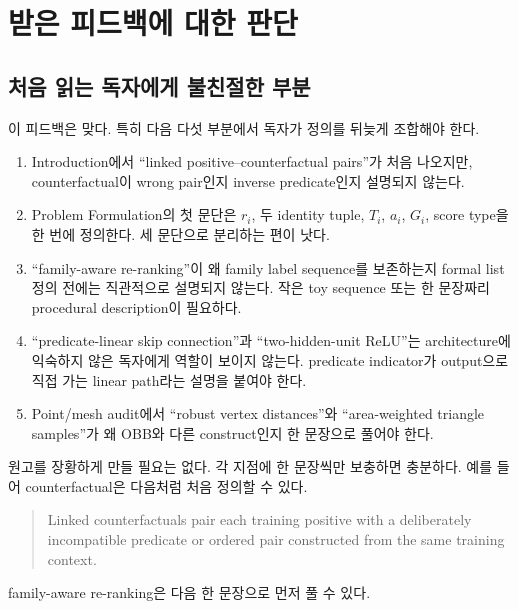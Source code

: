 \documentclass[11pt]{article}
\begin{document}
\section{받은 피드백에 대한 판단}

\subsection{처음 읽는 독자에게 불친절한 부분}

이 피드백은 맞다. 특히 다음 다섯 부분에서 독자가 정의를 뒤늦게 조합해야 한다.

\begin{enumerate}[leftmargin=2em]
    \item Introduction에서 ``linked positive--counterfactual pairs''가 처음
    나오지만, counterfactual이 wrong pair인지 inverse predicate인지 설명되지 않는다.
    
    \item Problem Formulation의 첫 문단은 $r_i$, 두 identity tuple, $T_i$, $a_i$,
    $G_i$, score type을 한 번에 정의한다. 세 문단으로 분리하는 편이 낫다.

    \item ``family-aware re-ranking''이 왜 family label sequence를 보존하는지
    formal list 정의 전에는 직관적으로 설명되지 않는다. 작은 toy sequence 또는
    한 문장짜리 procedural description이 필요하다.

    \item ``predicate-linear skip connection''과 ``two-hidden-unit ReLU''는
    architecture에 익숙하지 않은 독자에게 역할이 보이지 않는다. predicate indicator가
    output으로 직접 가는 linear path라는 설명을 붙여야 한다.

    \item Point/mesh audit에서 ``robust vertex distances''와 ``area-weighted
    triangle samples''가 왜 OBB와 다른 construct인지 한 문장으로 풀어야 한다.
\end{enumerate}

원고를 장황하게 만들 필요는 없다. 각 지점에 한 문장씩만 보충하면 충분하다. 예를
들어 counterfactual은 다음처럼 처음 정의할 수 있다.

\begin{quote}
Linked counterfactuals pair each training positive with a deliberately
incompatible predicate or ordered pair constructed from the same training
context.
\end{quote}

family-aware re-ranking은 다음 한 문장으로 먼저 풀 수 있다.
\end{document}
